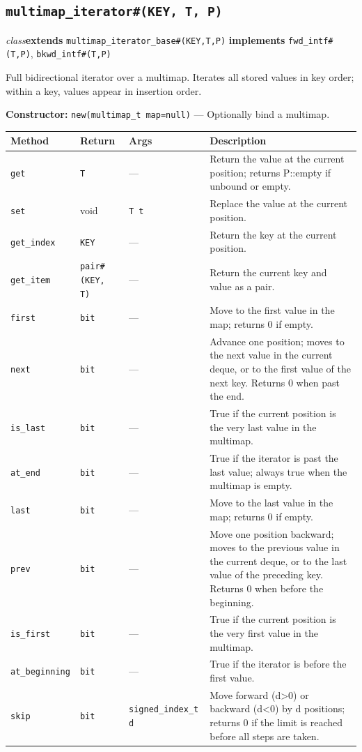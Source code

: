 \documentclass[11pt,letterpaper]{report}
\begin{document}
\subsection*{\texttt{multimap\_iterator\#(KEY, T, P)}}
\noindent\small\textit{class}\quad \textbf{extends} \texttt{multimap\_iterator\_base\#(KEY,T,P)} \quad \textbf{implements} \texttt{fwd\_intf\#(T,P)}, \texttt{bkwd\_intf\#(T,P)}\par

Full bidirectional iterator over a multimap. Iterates all stored values in key order; within a key, values appear in insertion order.

\noindent\textbf{Constructor:} \texttt{new(multimap\_t map=null)} --- Optionally bind a multimap.

\begin{xltabular}{\linewidth}{>{\small}p{1.35in} >{\small}p{1.25in} >{\small}p{0.95in} >{\small}X}
\toprule
\textbf{Method} & \textbf{Return} & \textbf{Args} & \textbf{Description} \\
\midrule
\endhead
\bottomrule
\endfoot
\texttt{get} & \texttt{T} & --- & Return the value at the current position; returns P::empty if unbound or empty. \\
\texttt{set} & void & \texttt{T t} & Replace the value at the current position. \\
\texttt{get\_index} & \texttt{KEY} & --- & Return the key at the current position. \\
\texttt{get\_item} & \texttt{pair\#(KEY, T)} & --- & Return the current key and value as a pair. \\
\texttt{first} & \texttt{bit} & --- & Move to the first value in the map; returns 0 if empty. \\
\texttt{next} & \texttt{bit} & --- & Advance one position; moves to the next value in the current deque, or to the first value of the next key. Returns 0 when past the end. \\
\texttt{is\_last} & \texttt{bit} & --- & True if the current position is the very last value in the multimap. \\
\texttt{at\_end} & \texttt{bit} & --- & True if the iterator is past the last value; always true when the multimap is empty. \\
\texttt{last} & \texttt{bit} & --- & Move to the last value in the map; returns 0 if empty. \\
\texttt{prev} & \texttt{bit} & --- & Move one position backward; moves to the previous value in the current deque, or to the last value of the preceding key. Returns 0 when before the beginning. \\
\texttt{is\_first} & \texttt{bit} & --- & True if the current position is the very first value in the multimap. \\
\texttt{at\_beginning} & \texttt{bit} & --- & True if the iterator is before the first value. \\
\texttt{skip} & \texttt{bit} & \texttt{signed\_index\_t d} & Move forward (d\textgreater{}0) or backward (d\textless{}0) by d positions; returns 0 if the limit is reached before all steps are taken. \\
\end{xltabular}
\end{document}

